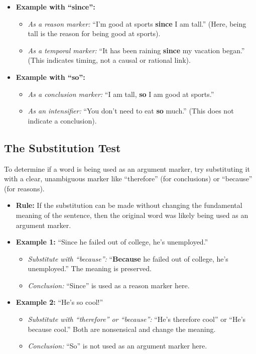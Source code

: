 \documentclass[12pt]{article}
\begin{document}
\begin{itemize}
    \item \textbf{Example with ``since'':}
          \begin{itemize}
              \item \textit{As a reason marker:} ``I'm good at sports \textbf{since} I am tall.'' (Here, being tall is the reason for being good at sports).
              \item \textit{As a temporal marker:} ``It has been raining \textbf{since} my vacation began.'' (This indicates timing, not a causal or rational link).
          \end{itemize}
    \item \textbf{Example with ``so'':}
          \begin{itemize}
              \item \textit{As a conclusion marker:} ``I am tall, \textbf{so} I am good at sports.''
              \item \textit{As an intensifier:} ``You don't need to eat \textbf{so} much.'' (This does not indicate a conclusion).
          \end{itemize}
\end{itemize}

\subsection{The Substitution Test}
To determine if a word is being used as an argument marker, try substituting it with a clear, unambiguous marker like ``therefore'' (for conclusions) or ``because'' (for reasons).
\begin{itemize}
    \item \textbf{Rule:} If the substitution can be made without changing the fundamental meaning of the sentence, then the original word was likely being used as an argument marker.
    \item \textbf{Example 1:} ``Since he failed out of college, he's unemployed.''
          \begin{itemize}
              \item \textit{Substitute with ``because'':} ``\textbf{Because} he failed out of college, he's unemployed.'' The meaning is preserved.
              \item \textit{Conclusion:} ``Since'' is used as a reason marker here.
          \end{itemize}
    \item \textbf{Example 2:} ``He's so cool!''
          \begin{itemize}
              \item \textit{Substitute with ``therefore'' or ``because'':} ``He's therefore cool'' or ``He's because cool.'' Both are nonsensical and change the meaning.
              \item \textit{Conclusion:} ``So'' is not used as an argument marker here.
          \end{itemize}
\end{itemize}
\end{document}
